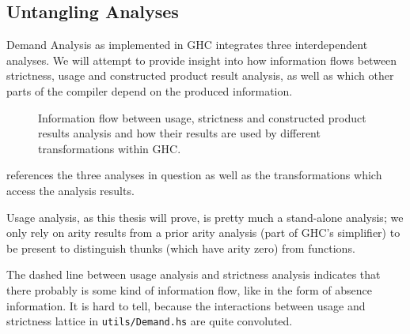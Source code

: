 \subsection{Untangling Analyses}\label{sec:untangle}

Demand Analysis as implemented in GHC integrates three interdependent analyses.
We will attempt to provide insight into how information flows between strictness, usage and constructed product result analysis, as well as which other parts of the compiler depend on the produced information.

\begin{figure}[h]
  \centering
  \caption{Information flow between usage, strictness and constructed product results analysis and how their results are used by different transformations within GHC.}
  \label{fig:dmd}
\end{figure}

 references the three analyses in question as well as the transformations which access the analysis results.

Usage analysis, as this thesis will prove, is pretty much a stand-alone analysis; we only rely on arity results from a prior arity analysis (part of GHC's simplifier) to be present to distinguish thunks (which have arity zero) from functions.

The dashed line between usage analysis and strictness analysis indicates that there probably is some kind of information flow, like in the form of absence information. 
It is hard to tell, because the interactions between usage and strictness lattice in \texttt{utils/Demand.hs} are quite convoluted.

